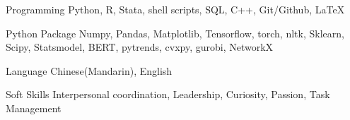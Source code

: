 

\begin{cvskills}

  \cvskill
    {Programming} %
    {Python, R, Stata, shell scripts, SQL, C++, Git/Github, \LaTeX} %

  \cvskill
    {Python Package} %
    {Numpy, Pandas, Matplotlib, Tensorflow, torch, nltk, Sklearn, Scipy, Statsmodel,
    BERT, pytrends, cvxpy,
    gurobi, NetworkX}
    
  \cvskill
    {Language} %
    {Chinese(Mandarin), English} %
    
  \cvskill
    {Soft Skills} %
    {Interpersonal coordination, Leadership, Curiosity, Passion, Task Management} %

\end{cvskills}
